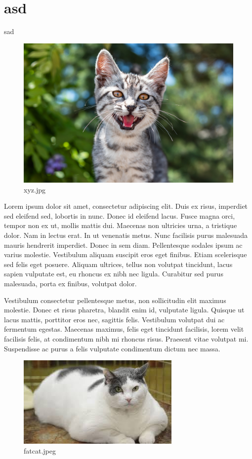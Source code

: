 \chapter{asd}sad
\begin{figure}[htpb]
\centering
\includegraphics[width=\textwidth,height=\textheight,keepaspectratio]{../../static/xyz.jpg}
\caption{xyz.jpg}
\end{figure}Lorem ipsum dolor sit amet, consectetur adipiscing elit. Duis ex risus, imperdiet sed eleifend sed, lobortis in nunc. Donec id eleifend lacus. Fusce magna orci, tempor non ex ut, mollis mattis dui. Maecenas non ultricies urna, a tristique dolor. Nam in lectus erat. In ut venenatis metus. Nunc facilisis purus malesuada mauris hendrerit imperdiet. Donec in sem diam. Pellentesque sodales ipsum ac varius molestie. Vestibulum aliquam suscipit eros eget finibus. Etiam scelerisque sed felis eget posuere. Aliquam ultrices, tellus non volutpat tincidunt, lacus sapien vulputate est, eu rhoncus ex nibh nec ligula. Curabitur sed purus malesuada, porta ex finibus, volutpat dolor.

Vestibulum consectetur pellentesque metus, non sollicitudin elit maximus molestie. Donec et risus pharetra, blandit enim id, vulputate ligula. Quisque ut lacus mattis, porttitor eros nec, sagittis felis. Vestibulum volutpat dui ac fermentum egestas. Maecenas maximus, felis eget tincidunt facilisis, lorem velit facilisis felis, at condimentum nibh mi rhoncus risus. Praesent vitae volutpat mi. Suspendisse ac purus a felis vulputate condimentum dictum nec massa.
\begin{figure}[htpb]
\centering
\includegraphics[width=\textwidth,height=\textheight,keepaspectratio]{../../static/fatcat.jpeg}
\caption{fatcat.jpeg}
\end{figure}